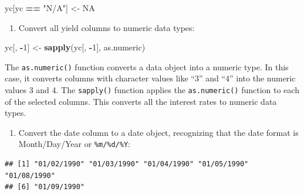 \documentclass[
]{book}
\newenvironment{Shaded}{\begin{snugshade}}{\end{snugshade}}
\newcommand{\AttributeTok}[1]{\textcolor[rgb]{0.13,0.29,0.53}{#1}}
\newcommand{\CommentTok}[1]{\textcolor[rgb]{0.56,0.35,0.01}{\textit{#1}}}
\newcommand{\ConstantTok}[1]{\textcolor[rgb]{0.56,0.35,0.01}{#1}}
\newcommand{\DecValTok}[1]{\textcolor[rgb]{0.00,0.00,0.81}{#1}}
\newcommand{\FunctionTok}[1]{\textcolor[rgb]{0.13,0.29,0.53}{\textbf{#1}}}
\newcommand{\NormalTok}[1]{#1}
\newcommand{\OtherTok}[1]{\textcolor[rgb]{0.56,0.35,0.01}{#1}}
\newcommand{\SpecialCharTok}[1]{\textcolor[rgb]{0.81,0.36,0.00}{\textbf{#1}}}
\newcommand{\StringTok}[1]{\textcolor[rgb]{0.31,0.60,0.02}{#1}}
\providecommand{\tightlist}{%
  \setlength{\itemsep}{0pt}\setlength{\parskip}{0pt}}
\begin{document}
\begin{Shaded}
\begin{Highlighting}[]
\NormalTok{yc[yc }\SpecialCharTok{==} \StringTok{"N/A"}\NormalTok{] }\OtherTok{\textless{}{-}} \ConstantTok{NA}
\end{Highlighting}
\end{Shaded}

\begin{enumerate}
\def\labelenumi{\arabic{enumi}.}
\setcounter{enumi}{1}
\tightlist
\item
  Convert all yield columns to numeric data types:
\end{enumerate}

\begin{Shaded}
\begin{Highlighting}[]
\NormalTok{yc[, }\SpecialCharTok{{-}}\DecValTok{1}\NormalTok{] }\OtherTok{\textless{}{-}} \FunctionTok{sapply}\NormalTok{(yc[, }\SpecialCharTok{{-}}\DecValTok{1}\NormalTok{], as.numeric)}
\end{Highlighting}
\end{Shaded}

The \texttt{as.numeric()} function converts a data object into a numeric type. In this case, it converts columns with character values like ``3'' and ``4'' into the numeric values 3 and 4. The \texttt{sapply()} function applies the \texttt{as.numeric()} function to each of the selected columns. This converts all the interest rates to numeric data types.

\begin{enumerate}
\def\labelenumi{\arabic{enumi}.}
\setcounter{enumi}{2}
\tightlist
\item
  Convert the date column to a date object, recognizing that the date format is Month/Day/Year or \texttt{\%m/\%d/\%Y}:
\end{enumerate}

\begin{Shaded}
\end{Shaded}

\begin{verbatim}
## [1] "01/02/1990" "01/03/1990" "01/04/1990" "01/05/1990" "01/08/1990"
## [6] "01/09/1990"
\end{verbatim}

\begin{Shaded}
\end{Shaded}
\end{document}
